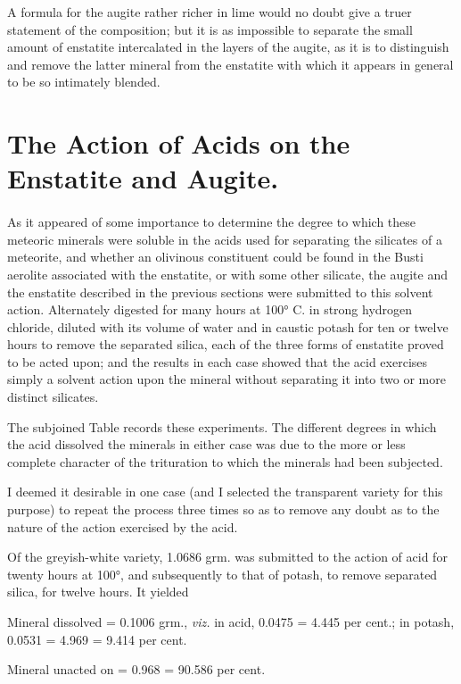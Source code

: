 \documentclass[a4paper, 12pt, oneside]{article}
\begin{document}
A formula for the augite rather richer in lime would no doubt give a truer statement of the composition; but it is as impossible to separate the small amount of enstatite intercalated in the layers of the augite, as it is to distinguish and remove the latter mineral from the enstatite with which it appears in general to be so intimately blended.
\clearpage
\section{The Action of Acids on the Enstatite and Augite.}
\paragraph{}
As it appeared of some importance to determine the degree to which these meteoric minerals were soluble in the acids used for separating the silicates of a meteorite, and whether an olivinous constituent could be found in the Busti aerolite associated with the enstatite, or with some other silicate, the augite and the enstatite described in the previous sections were submitted to this solvent action. Alternately digested for many hours at 100° C. in strong hydrogen chloride, diluted with its volume of water and in caustic potash for ten or twelve hours to remove the separated silica, each of the three forms of enstatite proved to be acted upon; and the results in each case showed that the acid exercises simply a solvent action upon the mineral without separating it into two or more distinct silicates.

The subjoined Table records these experiments. The different degrees in which the acid dissolved the minerals in either case was due to the more or less complete character of the trituration to which the minerals had been subjected.

I deemed it desirable in one case (and I selected the transparent variety for this purpose) to repeat the process three times so as to remove any doubt as to the nature of the action exercised by the acid.

Of the greyish-white variety, 1.0686 grm. was submitted to the action of acid for twenty hours at 100°, and subsequently to that of potash, to remove separated silica, for twelve hours. It yielded

Mineral dissolved = 0.1006 grm., \emph{viz.} {in acid, 0.0475 = 4.445 per cent.; in potash, 0.0531 = 4.969} = 9.414 per cent.

Mineral unacted on = 0.968 = 90.586 per cent. 
\end{document}
